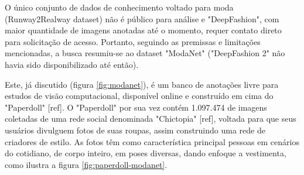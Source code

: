 \documentclass[12pt]{report}
\begin{document}
O único conjunto de dados de conhecimento voltado para moda (Runway2Realway dataset) não é público para análise e "DeepFashion", com maior quantidade de imagens anotadas até o momento, requer contato direto para solicitação de acesso. Portanto, seguindo as premissas e limitações mencionadas, a busca resumiu-se ao dataset "ModaNet" ("DeepFashion 2" não havia sido disponibilizado até então). 

Este, já discutido (figura \ref{fig:modanet}), é um banco de anotações livre para estudos de visão computacional, disponível online e construído em cima do "Paperdoll" [ref]. O "Paperdoll" por sua vez contém 1.097.474 de imagens coletadas de uma rede social denominada "Chictopia" [ref], voltada para que seus usuários divulguem fotos de suas roupas, assim construindo uma rede de criadores de estilo. As fotos têm como característica principal pessoas em cenários do cotidiano, de corpo inteiro, em poses diversas, dando enfoque a vestimenta, como ilustra a figura \ref{fig:paperdoll-modanet}. 
\end{document}
